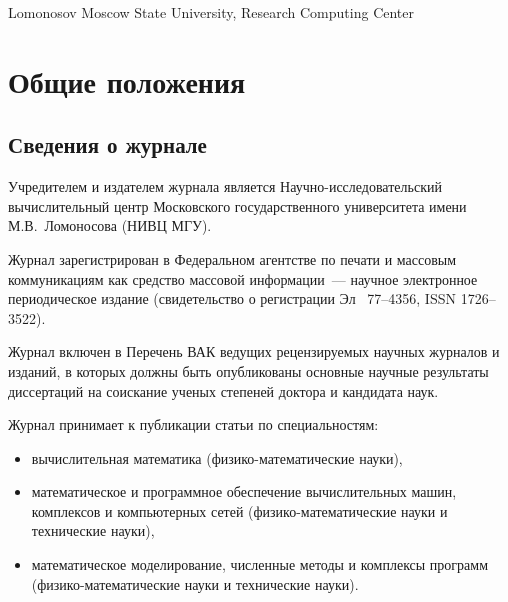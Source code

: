 \documentclass[10pt,a4paper]{book}
\begin{document}
{Lomonosov Moscow State University, Research Computing Center}


\MakeArticleHeader

\pagebreak

\section{Общие положения}

\subsection{Сведения о журнале}

Учредителем и издателем журнала является Научно-исследователь\-ский вычислительный центр
Московского государственного университета имени М.В.~Ломоносова (НИВЦ МГУ).

Журнал зарегистрирован в Федеральном агентстве по печати и массовым коммуникациям
как средство массовой информации~--- научное электронное периодическое издание
(свидетельство о регистрации Эл \No~77--4356, ISSN 1726--3522).

Журнал включен в Перечень ВАК ведущих рецензируемых научных журналов и изданий, в которых
должны быть опубликованы основные научные результаты диссертаций на соискание ученых
степеней доктора и кандидата наук.
 
Журнал принимает к публикации статьи по специальностям:
\begin{itemize}[itemsep=0pt,parsep=2pt,topsep=2pt,partopsep=0pt,leftmargin=27mm]
\item[01.01.07 ---]{вычислительная математика (физико-математические науки),}
\item[05.13.11 ---]{математическое и программное обеспечение вычислительных машин,
    комплексов и компьютерных сетей (физико-математические науки и технические науки),}
\item[05.13.18 ---]{математическое моделирование, численные методы и комплексы программ
    (физико-ма\-те\-ма\-ти\-чес\-кие науки и технические науки).}
\end{itemize}
\end{document}
